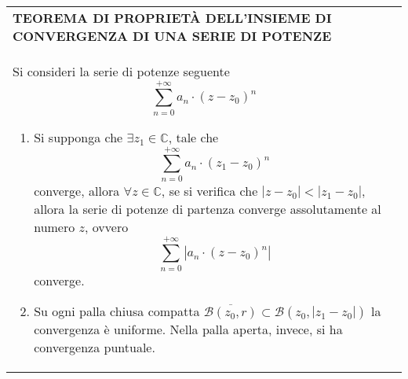 \documentclass[a4paper]{extarticle}
\renewcommand\arraystretch{}
\begin{document}
\vspace{1em}
\setlength{\tabcolsep}{14pt}
\renewcommand{\arraystretch}{2}
\noindent
\begin{tabularx}{\textwidth}{@{}|P|@{}}
    \hline
    {\textbf{TEOREMA DI PROPRIETÀ DELL'INSIEME DI CONVERGENZA DI UNA SERIE DI POTENZE}}\\
    \parbox{\linewidth}{Si consideri la serie di potenze seguente
    \[\sum_{n=0}^{+\infty} a_n \cdot (z-z_0)^n\]
    \begin{enumerate}
        \item Si supponga che $\exists z_1 \in \mathbb{C}$, tale che
        \[\sum_{n=0}^{+\infty} a_n \cdot (z_1-z_0)^n\]
        converge, allora $\forall z \in \mathbb{C}$, se si verifica che $\left \vert z - z_0 \right \vert < \left \vert z_1 - z_0 \right \vert$, allora la serie di potenze di partenza converge assolutamente al numero $z$, ovvero
        \[\sum_{n=0}^{+\infty} \left \vert a_n \cdot (z-z_0)^n \right \vert\]
        converge.
    
        \item Su ogni palla chiusa compatta $\overline{\mathcal{B}(z_0,r)} \subset \mathcal{B}(z_0,\left \vert z_1-z_0 \right \vert)$ la convergenza è uniforme. Nella palla aperta, invece, si ha convergenza puntuale.
    \end{enumerate}
    \vspace{1mm}}\\
    \hline
\end{tabularx}
\end{document}
